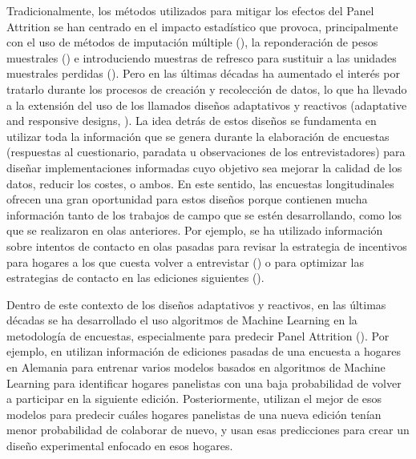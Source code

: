 Tradicionalmente, los métodos utilizados para mitigar los efectos del Panel Attrition se han centrado en el impacto estadístico que provoca, principalmente con el uso de métodos de imputación múltiple (\cite{rubin1987multiple}), la reponderación de pesos muestrales (\cite{groves2009survey}) e introduciendo muestras de refresco para sustituir a las unidades muestrales perdidas (\cite{hirano1998combining}). Pero en las últimas décadas ha aumentado el interés por tratarlo durante los procesos de creación y recolección de datos, lo que ha llevado a la extensión del uso de los llamados diseños adaptativos y reactivos (adaptative and responsive designs, \cite{tourangeau2017adaptive}). La idea detrás de estos diseños se fundamenta en utilizar toda la información que se genera durante la elaboración de encuestas (respuestas al cuestionario, paradata u observaciones de los entrevistadores) para diseñar implementaciones informadas cuyo objetivo sea mejorar la calidad de los datos, reducir los costes, o ambos. En este sentido, las encuestas longitudinales ofrecen una gran oportunidad para estos diseños porque contienen mucha información tanto de los trabajos de campo que se estén desarrollando, como los que se realizaron en olas anteriores. Por ejemplo, se ha utilizado información sobre intentos de contacto en olas pasadas para revisar la estrategia de incentivos para hogares a los que cuesta volver a entrevistar (\cite{mcgonagle2022effects}) o para optimizar las estrategias de contacto en las ediciones siguientes (\cite{kreuter2015note}).

Dentro de este contexto de los diseños adaptativos y reactivos, en las últimas décadas se ha desarrollado el uso algoritmos de Machine Learning en la metodología de encuestas, especialmente para predecir Panel Attrition (\cite{buskirk2018introduction}). Por ejemplo, en \cite{beste2023case} utilizan información de ediciones pasadas de una encuesta a hogares en Alemania para entrenar varios modelos basados en algoritmos de Machine Learning para identificar hogares panelistas con una baja probabilidad de volver a participar en la siguiente edición. Posteriormente, utilizan el mejor de esos modelos para predecir cuáles hogares panelistas de una nueva edición tenían menor probabilidad de colaborar de nuevo, y usan esas predicciones para crear un diseño experimental enfocado en esos hogares.

